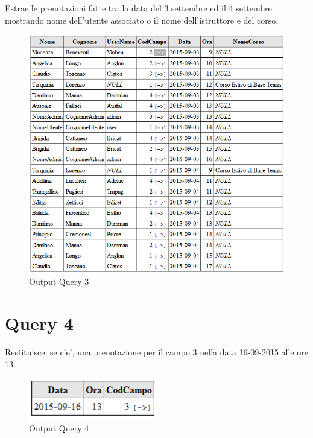 Estrae le prenotazioni fatte tra la data del 3 settembre ed il 4 settembre mostrando nome dell'utente associato o il nome dell'istruttore e del corso.\\



\begin{figure}[H]
 \centering
  \includegraphics[width=\textwidth]{images/Query3.PNG}
\caption{Output Query 3}
\end{figure}

\section{Query 4}
Restituisce, se c'e', una prenotazione per il campo 3 nella data 16-09-2015 alle ore 13.\\



\begin{figure}[H]
 \centering
  \includegraphics[width=0.5\textwidth]{images/Query4.PNG}
\caption{Output Query 4}
\end{figure}

